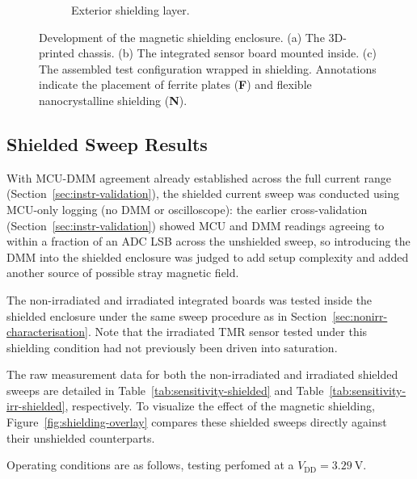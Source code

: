 \documentclass[12pt,a4paper]{article}
\begin{document}
\begin{figure}[H]
\begin{subfigure}[b]{0.32\textwidth}
        \caption{Exterior shielding layer.}
        \label{fig:box_nano}
    \end{subfigure}
    
    \caption{Development of the magnetic shielding enclosure. (a) The 3D-printed chassis. (b) The integrated sensor board mounted inside. (c) The assembled test configuration wrapped in shielding. Annotations indicate the placement of ferrite plates (\textbf{F}) and flexible nanocrystalline shielding (\textbf{N}).} 
    \label{fig:shielding_enclosure}
\end{figure}
    

\subsection{Shielded Sweep Results}
\label{sec:shielded-results}

With MCU-DMM agreement already established across the full current range (Section~\ref{sec:instr-validation}), the shielded current sweep was conducted using MCU-only logging (no DMM or oscilloscope): the earlier cross-validation (Section~\ref{sec:instr-validation}) showed MCU and DMM readings agreeing to within a fraction of an ADC LSB across the unshielded sweep, so introducing the DMM into the shielded enclosure was judged to add setup complexity and added another source of possible stray magnetic field.

The non-irradiated and irradiated integrated boards was tested inside the shielded enclosure under the same sweep procedure as in Section~\ref{sec:nonirr-characterisation}.  Note that the irradiated TMR sensor tested under this shielding condition had not previously been driven into saturation. 

The raw measurement data for both the non-irradiated and irradiated shielded sweeps are detailed in Table~\ref{tab:sensitivity-shielded} and Table~\ref{tab:sensitivity-irr-shielded}, respectively. To visualize the effect of the magnetic shielding, Figure~\ref{fig:shielding-overlay} compares these shielded sweeps directly against their unshielded counterparts.

Operating conditions are as follows, testing perfomed at a $V_{\text{DD}} = \SI{3.29}{\volt}$.
\end{document}
